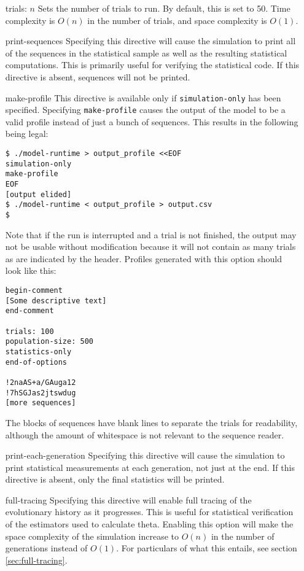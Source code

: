 \documentclass{article}
\begin{document}
        \begin{enumerate}
          \item[trials: $n$]
          Sets the number of trials to run. By default, this is set to 50. Time
          complexity is $O(n)$ in the number of trials, and space complexity is
          $O(1)$.

          \item[print-sequences]
          Specifying this directive will cause the simulation to print all of
          the sequences in the statistical sample as well as the resulting
          statistical computations. This is primarily useful for verifying the
          statistical code. If this directive is absent, sequences will not be
          printed.

	  \item[make-profile]
	  This directive is available only if \verb|simulation-only| has been
	  specified. Specifying \verb|make-profile| causes the output of the
	  model to be a valid profile instead of just a bunch of sequences. This
	  results in the following being legal:

	  \begin{verbatim}
$ ./model-runtime > output_profile <<EOF
simulation-only
make-profile
EOF
[output elided]
$ ./model-runtime < output_profile > output.csv
$
	  \end{verbatim}

	  Note that if the run is interrupted and a trial is not finished, the
	  output may not be usable without modification because it will not
	  contain as many trials as are indicated by the header. Profiles
	  generated with this option should look like this:

	  \begin{verbatim}
begin-comment
[Some descriptive text]
end-comment

trials: 100
population-size: 500
statistics-only
end-of-options

!2naAS+a/GAuga12
!7hSGJas2jtswdug
[more sequences]
	  \end{verbatim}

	  The blocks of sequences have blank lines to separate the trials for
	  readability, although the amount of whitespace is not relevant to the
	  sequence reader.

          \item[print-each-generation]
          Specifying this directive will cause the simulation to print
          statistical measurements at each generation, not just at the end. If
          this directive is absent, only the final statistics will be printed.

          \item[full-tracing]
          Specifying this directive will enable full tracing of the evolutionary
          history as it progresses. This is useful for statistical verification
          of the estimators used to calculate theta. Enabling this option will
          make the space complexity of the simulation increase to $O(n)$ in the
          number of generations instead of $O(1)$. For particulars of what this
          entails, see section \ref{sec:full-tracing}.
        \end{enumerate}
\end{document}
